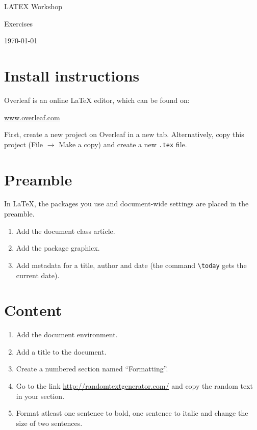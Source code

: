 \documentclass{article}
\begin{document}
\begin{center}
  {\Large LATEX Workshop\par}
  \vspace{0.5em}
  {\large Exercises\par}
  \vspace{1.5em}
  \today
\end{center}

\bigskip

\section*{Install instructions}
Overleaf is an online LaTeX editor, which can be found on:

\begin{center}
  \url{www.overleaf.com}
\end{center}

First, create a new project on Overleaf in a new tab. Alternatively, copy this project (File $\rightarrow$ Make a copy) and create a new \texttt{.tex} file.

\section{Preamble}
In \LaTeX, the packages you use and document-wide settings are placed in the preamble.

\begin{enumerate}[label=\alph*)]
  \item Add the document class article.
  \item Add the package graphicx.
  \item Add metadata for a title, author and date (the command \verb|\today| gets the current date).
\end{enumerate}

\section{Content}
\begin{enumerate}[label=\alph*)]
  \item Add the document environment.
  \item Add a title to the document.
  \item Create a numbered section named ``Formatting''.
  \item Go to the link \url{http://randomtextgenerator.com/} and copy the random text in your section.
  \item Format atleast one sentence to bold, one sentence to italic and change the size of two sentences.
\end{enumerate}
\end{document}
